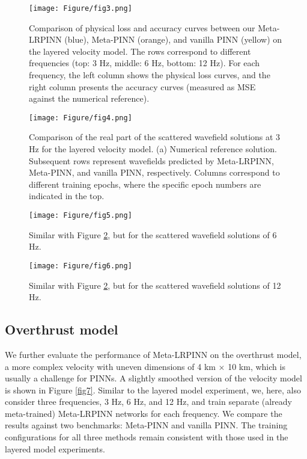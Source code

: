 \begin{figure}[htbp]
\centering
\texttt{[image: Figure/fig3.png]}
\caption{Comparison of physical loss and accuracy curves between our Meta-LRPINN (blue), Meta-PINN (orange), and vanilla PINN (yellow) on the layered velocity model. The rows correspond to different frequencies (top: 3 Hz, middle: 6 Hz, bottom: 12 Hz). For each frequency, the left column shows the physical loss curves, and the right column presents the accuracy curves (measured as MSE against the numerical reference).}
\label{fig3}
\end{figure}

\begin{figure}[htbp]
\centering
\texttt{[image: Figure/fig4.png]}
\caption{Comparison of the real part of the scattered wavefield solutions at 3 Hz for the layered velocity model. (a) Numerical reference solution. Subsequent rows represent wavefields predicted by Meta-LRPINN, Meta-PINN, and vanilla PINN, respectively. Columns correspond to different training epochs, where the specific epoch numbers are indicated in the top.}
\label{fig4}
\end{figure}

\begin{figure}[htbp]
\centering
\texttt{[image: Figure/fig5.png]}
\caption{Similar with Figure \ref{fig4}, but for the scattered wavefield solutions of 6 Hz.}
\label{fig5}
\end{figure}

\begin{figure}[htbp]
\centering
\texttt{[image: Figure/fig6.png]}
\caption{Similar with Figure \ref{fig4}, but for the scattered wavefield solutions of 12 Hz.}
\label{fig6}
\end{figure}


\subsection{Overthrust model}
We further evaluate the performance of Meta-LRPINN on the overthrust model, a more complex velocity with uneven dimensions of 4 km $\times$ 10 km, which is usually a challenge for PINNs. A slightly smoothed version of the velocity model is shown in Figure \ref{fig7}. Similar to the layered model experiment, we, here, also consider three frequencies, 3 Hz, 6 Hz, and 12 Hz, and train separate (already meta-trained) Meta-LRPINN networks for each frequency. We compare the results against two benchmarks: Meta-PINN and vanilla PINN. The training configurations for all three methods remain consistent with those used in the layered model experiments. 

